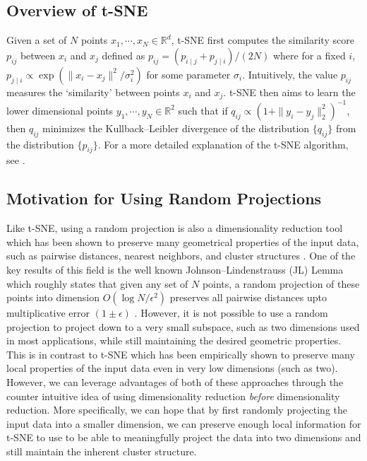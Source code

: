 \documentclass[12pt]{opt2019} %
\begin{document}
\subsection{Overview of t-SNE}\label{sec:overview}
Given a set of $N$ points $x_1, \cdots, x_N \in \mathbb{R}^d$, t-SNE first computes the similarity score $p_{ij}$ between $x_i$ and $x_j$ defined as $p_{ij} = (p_{i \mid j} + p_{j \mid i})/(2N)$ where for a fixed $i$, $p_{j \mid i} \propto \exp(\|x_i-x_j\|^2/\sigma_i^2)$ for some parameter $\sigma_i$. Intuitively, the value $p_{ij}$ measures the `similarity' between points $x_i$ and $x_j$. t-SNE then aims to learn the lower dimensional points $y_1, \cdots, y_N \in \mathbb{R}^2$ such that if $q_{ij} \propto (1+\|y_i-y_j \|_2^2)^{-1}$, then $q_{ij}$ minimizes the Kullback–Leibler divergence of the distribution $\{q_{ij}\}$ from the distribution $\{p_{ij}\}$. For a more detailed explanation of the t-SNE algorithm, see \cite{orig_tsne}.

\subsection{Motivation for Using Random Projections}\label{sec:motivation}
Like t-SNE, using a random projection is also a dimensionality reduction tool which has been shown to preserve many geometrical properties of the input data, such as pairwise distances, nearest neighbors, and cluster structures \cite{jlproof, nearestneighbor_embeddings, kclustering}. One of the key results of this field is the well known Johnson–Lindenstrauss (JL) Lemma which roughly states that given any set of $N$ points, a random projection of these points into dimension $O(\log N/\epsilon^2)$ preserves all pairwise distances upto multiplicative error $(1 \pm \epsilon)$ \cite{jlproof}. However, it is not possible to use a random projection to project down to a very small subspace, such as two dimensions used in most applications, while still maintaining the desired geometric properties. This is in contrast to t-SNE which has been empirically shown to preserve many local properties of the input data even in very low dimensions (such as two). However, we can leverage advantages of both of these approaches through the counter intuitive idea of using dimensionality reduction \emph{before} dimensionality reduction. More specifically, we can hope that by first randomly projecting the input data into a smaller dimension, we can preserve enough local information for t-SNE to use to be able to meaningfully project the data into two dimensions and still maintain the inherent cluster structure. 
\end{document}
